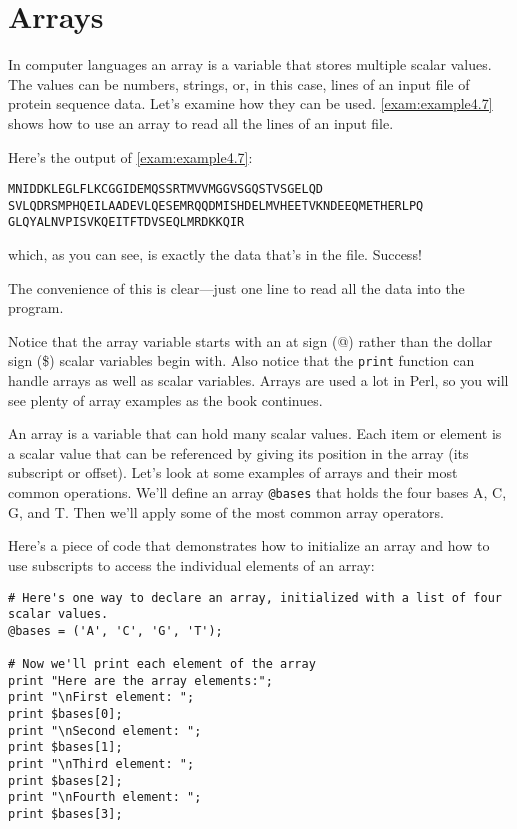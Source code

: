 \section{Arrays}
In computer languages an array is a variable that stores multiple scalar values. The values can be numbers, strings, or, in this case, lines of an input file of protein sequence data. Let's examine how they can be used. \autoref{exam:example4.7} shows how to use an array to read all the lines of an input file.



Here's the output of \autoref{exam:example4.7}:

\begin{lstlisting}
MNIDDKLEGLFLKCGGIDEMQSSRTMVVMGGVSGQSTVSGELQD
SVLQDRSMPHQEILAADEVLQESEMRQQDMISHDELMVHEETVKNDEEQMETHERLPQ
GLQYALNVPISVKQEITFTDVSEQLMRDKKQIR
\end{lstlisting}

which, as you can see, is exactly the data that's in the file. Success!

The convenience of this is clear—just one line to read all the data into the program. 

Notice that the array variable starts with an at sign (@) rather than the dollar sign (\$) scalar variables begin with. Also notice that the \verb|print| function can handle arrays as well as scalar variables. Arrays are used a lot in Perl, so you will see plenty of array examples as the book continues.  

An array is a variable that can hold many scalar values. Each item or element is a scalar value that can be referenced by giving its position in the array (its subscript or offset). Let's look at some examples of arrays and their most common operations. We'll define an array \verb|@bases| that holds the four bases A, C, G, and T. Then we'll apply some of the most common array operators.

Here's a piece of code that demonstrates how to initialize an array and how to use subscripts to access the individual elements of an array: 

\begin{lstlisting}
# Here's one way to declare an array, initialized with a list of four scalar values.
@bases = ('A', 'C', 'G', 'T');

# Now we'll print each element of the array
print "Here are the array elements:";
print "\nFirst element: ";
print $bases[0];
print "\nSecond element: ";
print $bases[1];
print "\nThird element: ";
print $bases[2];
print "\nFourth element: ";
print $bases[3];
\end{lstlisting}

